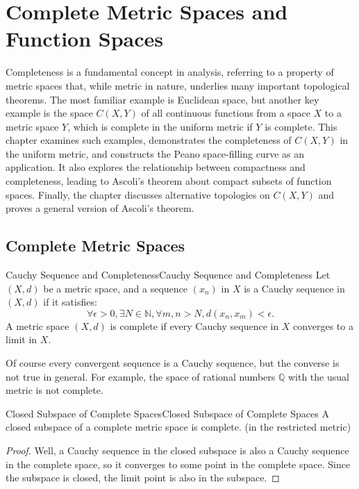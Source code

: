 \documentclass[../main.tex]{subfiles}
\begin{document}
\chapter{Complete Metric Spaces and Function Spaces}
Completeness is a fundamental concept in analysis, referring to a property of metric spaces that, while metric in nature, underlies many important topological theorems. The most familiar example is Euclidean space, but another key example is the space $C(X, Y)$ of all continuous functions from a space $X$ to a metric space $Y$, which is complete in the uniform metric if $Y$ is complete. This chapter examines such examples, demonstrates the completeness of $C(X, Y)$ in the uniform metric, and constructs the Peano space-filling curve as an application. It also explores the relationship between compactness and completeness, leading to Ascoli's theorem about compact subsets of function spaces. Finally, the chapter discusses alternative topologies on $C(X, Y)$ and proves a general version of Ascoli's theorem.

\section{Complete Metric Spaces}

\begin{definition}{Cauchy Sequence and Completeness}{Cauchy Sequence and Completeness}
	Let $(X,d)$ be a metric space, and a sequence $(x_n)$ in $X$ is a Cauchy sequence in $(X,d)$ if it satisfies:
	\begin{equation}
		\forall \epsilon > 0, \exists N \in \mathbb{N}, \forall m,n > N, d(x_n, x_m) < \epsilon.
	\end{equation}
	A metric space $(X,d)$ is complete if every Cauchy sequence in $X$ converges to a limit in $X$.
\end{definition}

\begin{remark}
	Of course every convergent sequence is a Cauchy sequence, but the converse is not true in general. For example, the space of rational numbers $\mathbb{Q}$ with the usual metric is not complete.
\end{remark}

\begin{theorem}{Closed Subspace of Complete Spaces}{Closed Subspace of Complete Spaces}
	A closed subspace of a complete metric space is complete. (in the restricted metric)
\end{theorem}
\begin{proof}
	Well, a Cauchy sequence in the closed subspace is also a Cauchy sequence in the complete space, so it converges to some point in the complete space. Since the subspace is closed, the limit point is also in the subspace.
\end{proof}
\end{document}
